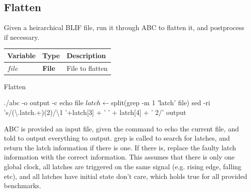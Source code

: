 \documentclass[12pt,final,oneside]{dwThesis} %
\begin{document}
   \subsection{Flatten}\label{algFlatten}
   Given a heirarchical \gls{BLIF} file, run it through \gls{ABC}\cite{abc} to flatten it, and postprocess if necessary.
   \begin{algorithm}
      \begin{center}
         \begin{tabularx}{\linewidth}{llX}
            \toprule
            Variable & Type & Description\\
            \midrule
            $file$ &\textbf{  File } &  File to flatten\\
            \bottomrule
         \end{tabularx}
      \end{center}
      \caption{Flatten}\label{Flatten}
      \begin{algorithmic}[1]
         \State ./abc -o output -c echo file
         \State $latch \gets $split(grep -m 1 '\.latch' file)
         \State sed -ri 's/(\textbackslash.latch.+)(2)/\textbackslash1 '+latch[3] + ' ' + latch[4] + ' 2/' output
         \EndIf
         \EndProcedure
      \end{algorithmic}
   \end{algorithm}

   \gls{ABC} is provided an input file, given the command to echo the current file,
   and told to output everything to output.
   grep is called to search for latches, and return the latch information if
   there is one. If there is, replace the faulty latch information with the
   correct information.
   This assumes that there is only one global clock, all latches are triggered on
   the same signal (e.g. rising edge, falling etc), and all latches have initial
   state don't care, which holds true for all provided benchmarks.
\end{document}
